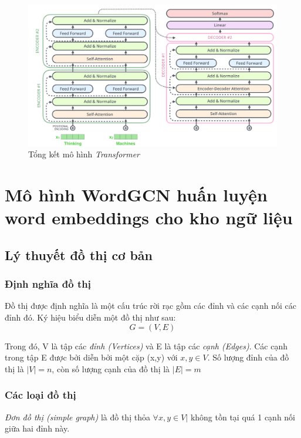 \begin{figure}[H]
    \begin{center}
        \includegraphics[scale=0.3]{images/transformer_sumary}
        \caption{Tổng kết mô hình \textit{Transformer} \cite{illustrated.transformer}}
        \label{fig:transformer-summary}
    \end{center}
\end{figure}


\section{Mô hình WordGCN huấn luyện word embeddings cho kho ngữ liệu}

\subsection{Lý thuyết đồ thị cơ bản}

\subsubsection{Định nghĩa đồ thị}

Đồ thị được định nghĩa là một cấu trúc rời rạc gồm các đỉnh và các cạnh nối các đỉnh đó. Ký hiệu biểu diễn một đồ thị như sau:
\begin{equation*}
	G = (V,E)
\end{equation*}

Trong đó, V là tập các \textit{đỉnh (Vertices)} và E là tập các \textit{cạnh (Edges)}. Các cạnh trong tập E được bởi diễn bởi một cặp (x,y) với $x,y \in V$. Số lượng đỉnh của đồ thị là $|V| = n$, còn số lượng cạnh của đồ thị là $|E| = m$

\subsubsection{Các loại đồ thị}
\textit{Đơn đồ thị (simple graph)} là đồ thị thỏa $\forall x,y \in V | $ không tồn tại quá 1 cạnh nối giữa hai đỉnh này.

